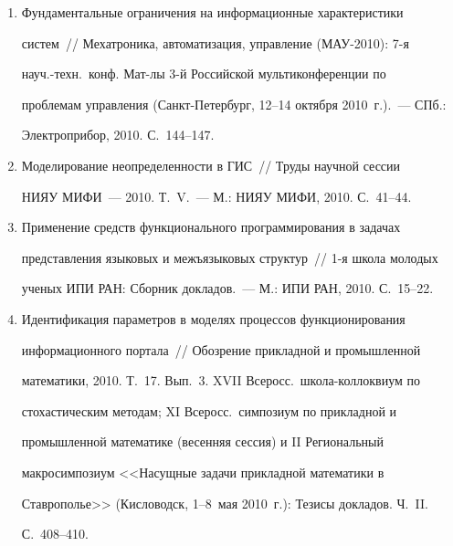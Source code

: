 \begin{enumerate}[1.]
(Нижний Архыз, 13--18~сентября 2010~г.).~--- URL: {\sf 


http://agora.guru.ru/VAK-2010/files/354\_Gurevich\_\_Basic\_information\_characteristics\_of\_our\_Universe.doc}.


\item {}


Фундаментальные ограничения на информационные характеристики 


сис\-тем~/\!\!/  Мехатроника, автоматизация, управление (МАУ-2010): 7-я 


науч.-техн.\ конф.\: Мат-лы 3-й Российской мультиконференции по 


проблемам управления (Санкт-Петербург, 12--14 октября 2010~г.).~--- СПб.: 


Электроприбор, 2010. С.~144--147.


\item {}


Моделирование неопределенности в ГИС~/\!\!/  Труды научной сессии 


НИЯУ МИФИ~--- 2010. Т.~V.~--- М.: НИЯУ МИФИ, 2010. С.~41--44.


\item {}


Применение средств функционального программирования в задачах 


представления языковых и межъязыковых структур~/\!\!/  1-я школа молодых 


ученых ИПИ РАН: Сборник докладов.~--- М.: ИПИ РАН, 2010. С.~15--22.


\item {}


Идентификация параметров в моделях процессов функционирования 


информационного портала~/\!\!/  Обозрение прикладной и промышленной 


математики, 2010. Т.~17. Вып.~3. XVII Всеросс.\ школа-коллоквиум по 


стохастическим методам; XI Всеросс.\ симпозиум по прикладной и 


промышленной математике (весенняя сессия) и II Региональный 


макросимпозиум <<Насущные задачи прикладной математики в 


Ставрополье>> (Кисловодск, 1--8~мая 2010~г.): Тезисы докладов. Ч.~II. 


С.~408--410.



\end{enumerate}
